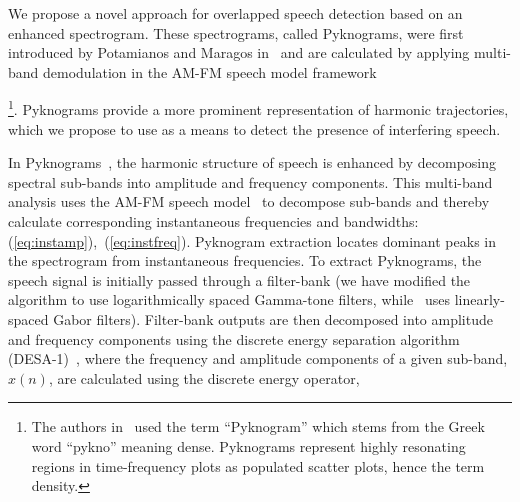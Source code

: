 We propose a novel approach for overlapped speech detection based on an enhanced spectrogram. 
These spectrograms, called Pyknograms, were first introduced by Potamianos and Maragos in~\cite{potamianos_maragos_icassp95,potamianos_maragos_jasa96} and are calculated by applying multi-band demodulation in the AM-FM speech model framework~\cite{maragos_kaiser_quatieri}{\footnote{The authors in~\cite{potamianos_maragos_jasa96} used the term ``Pyknogram'' which stems from the Greek word ``pykno'' meaning dense. Pyknograms represent highly resonating regions in time-frequency plots as populated scatter plots, hence the term density.}. 
Pyknograms provide a more prominent representation of harmonic trajectories, which we propose to use as a means to detect the presence of interfering speech.


In Pyknograms~\cite{potamianos_maragos_jasa96}, the harmonic structure of speech is enhanced by decomposing spectral sub-bands into amplitude and frequency components. 
This multi-band analysis uses the AM-FM speech model~\cite{maragos_kaiser_quatieri} to decompose sub-bands and thereby calculate corresponding instantaneous frequencies and bandwidths: (\ref{eq:instamp}),~(\ref{eq:instfreq}). 
Pyknogram extraction locates dominant peaks in the spectrogram from instantaneous frequencies. 
To extract Pyknograms, the speech signal is initially passed through a filter-bank (we have modified the algorithm to use logarithmically spaced Gamma-tone filters, while~\cite{potamianos_maragos_jasa96} uses linearly-spaced Gabor filters). 
Filter-bank outputs are then decomposed into amplitude and frequency components using the discrete energy separation algorithm (DESA-1)~\cite{maragos_kaiser_quatieri}, where the frequency and amplitude components of a given sub-band, $x(n)$, are calculated using the discrete energy operator,
 
 
}
